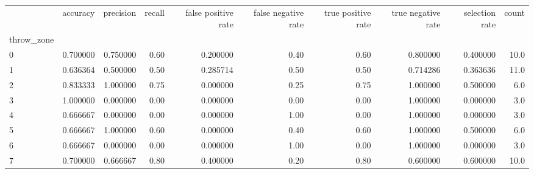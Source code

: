 \begin{tabular}{lrrrrrrrrr}
\toprule
{} &  accuracy &  precision &  recall &  false positive rate &  false negative rate &  true positive rate &  true negative rate &  selection rate &  count \\
throw\_zone &           &            &         &                      &                      &                     &                     &                 &        \\
\midrule
0          &  0.700000 &   0.750000 &    0.60 &             0.200000 &                 0.40 &                0.60 &            0.800000 &        0.400000 &   10.0 \\
1          &  0.636364 &   0.500000 &    0.50 &             0.285714 &                 0.50 &                0.50 &            0.714286 &        0.363636 &   11.0 \\
2          &  0.833333 &   1.000000 &    0.75 &             0.000000 &                 0.25 &                0.75 &            1.000000 &        0.500000 &    6.0 \\
3          &  1.000000 &   0.000000 &    0.00 &             0.000000 &                 0.00 &                0.00 &            1.000000 &        0.000000 &    3.0 \\
4          &  0.666667 &   0.000000 &    0.00 &             0.000000 &                 1.00 &                0.00 &            1.000000 &        0.000000 &    3.0 \\
5          &  0.666667 &   1.000000 &    0.60 &             0.000000 &                 0.40 &                0.60 &            1.000000 &        0.500000 &    6.0 \\
6          &  0.666667 &   0.000000 &    0.00 &             0.000000 &                 1.00 &                0.00 &            1.000000 &        0.000000 &    3.0 \\
7          &  0.700000 &   0.666667 &    0.80 &             0.400000 &                 0.20 &                0.80 &            0.600000 &        0.600000 &   10.0 \\
\bottomrule
\end{tabular}
